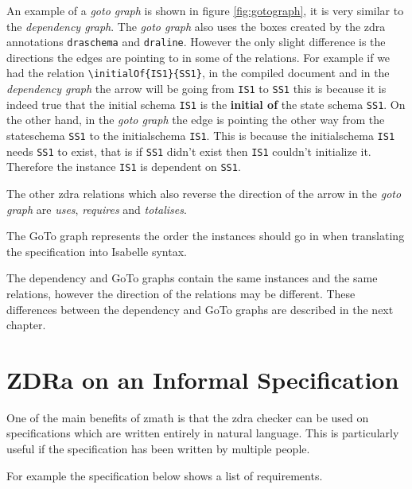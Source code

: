 An example of a \emph{goto graph} is shown in figure \ref{fig:gotograph}, it is
very similar to the \emph{dependency graph}. The \emph{goto graph} also uses the
boxes created by the \gls{zdra} annotations \verb|draschema| and \verb|draline|.
However the only slight difference is the directions the edges are pointing to
in some of the relations. For example if we had the relation
\verb|\initialOf{IS1}{SS1}|, in the compiled document and in the
\emph{dependency graph} the arrow will be going from \verb|IS1| to \verb|SS1|
this is because it is indeed true that the initial schema \verb|IS1| is the
\textbf{initial of} the state schema \verb|SS1|. On the other hand, in the
\emph{goto graph} the edge is pointing the other way from the stateschema
\verb|SS1| to the initialschema \verb|IS1|. This is because the initialschema
\verb|IS1| needs \verb|SS1| to exist, that is if \verb|SS1| didn't exist then
\verb|IS1| couldn't initialize it. Therefore the instance \verb|IS1| is dependent
on \verb|SS1|.

The other \gls{zdra} relations which also reverse the direction of the arrow in
the \emph{goto graph} are \emph{uses}, \emph{requires} and \emph{totalises}.

The GoTo graph represents the order the instances should go in when translating
the specification into Isabelle syntax.

The dependency and GoTo graphs contain the same instances and the same
relations, however  the direction of the relations may be different. These differences between the dependency and GoTo graphs are
described in the next chapter.

\section{ZDRa on an Informal Specification}
\label{sec:zdrainformal}

One of the main benefits of \gls{zmath} is that the \gls{zdra} checker can be used on
specifications which are written entirely in natural language. This is
particularly useful if the specification has been written by multiple people.

For example the specification below shows a list of requirements.

\noindent{}

